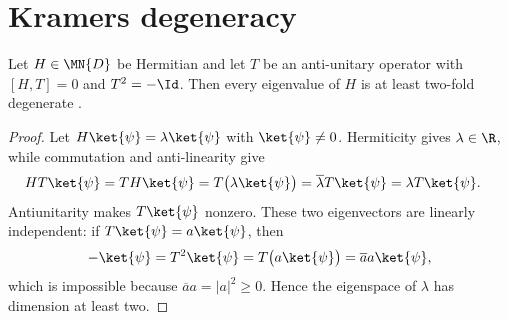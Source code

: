 \section{Kramers degeneracy}

\begin{theorem}
    \label{thm:kramers_degeneracy}
    \leanok
    Let $H\in\MN{D}$ be Hermitian and let $T$ be an anti-unitary operator with
    $[H,T]=0$ and $T^2=-\Id$. Then every eigenvalue of $H$ is at least two-fold
    degenerate \cite[Chapter~3, Kramer's theorem]{Wolf2012Quantum}.
\end{theorem}

\begin{proof}\leanok
    Let $H\ket{\psi}=\lambda\ket{\psi}$ with $\ket{\psi}\neq 0$. Hermiticity
    gives $\lambda\in\R$, while commutation and anti-linearity give
    \begin{align}
        H T\ket{\psi}
         & =T H\ket{\psi}
        =T\bigl(\lambda\ket{\psi}\bigr)
        =\overline\lambda T\ket{\psi}
        =\lambda T\ket{\psi}.
    \end{align}
    Antiunitarity makes $T\ket{\psi}$ nonzero. These two eigenvectors are linearly
    independent: if $T\ket{\psi}=a\ket{\psi}$, then
    \begin{align}
        -\ket{\psi}=T^2\ket{\psi}
        =T\bigl(a\ket{\psi}\bigr)
        =\overline a a\ket{\psi},
    \end{align}
    which is impossible because $\overline a a=|a|^2\geq0$. Hence the
    eigenspace of $\lambda$ has dimension at least two.
\end{proof}
